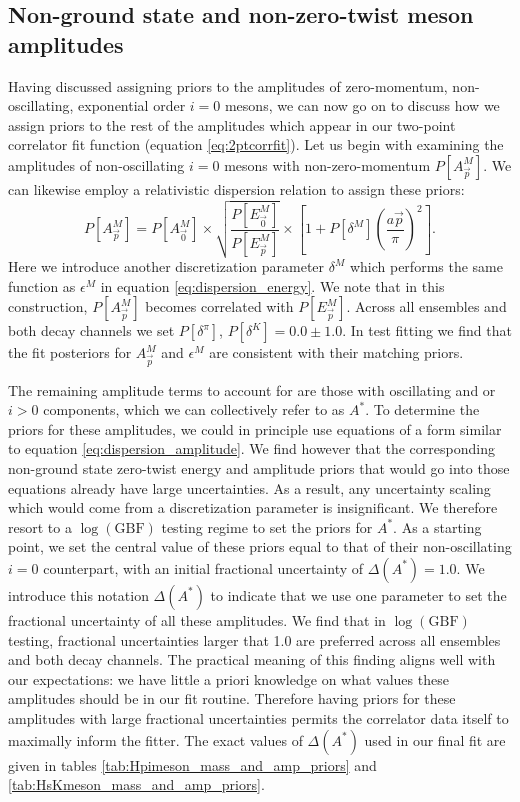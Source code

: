 \subsection{Non-ground state and non-zero-twist meson amplitudes}\label{sec:2ptamps_non_ground}
Having discussed assigning priors to the amplitudes of zero-momentum, non-oscillating, exponential order $i=0$ mesons, we can now go on to discuss how we assign priors to the rest of the amplitudes which appear in our two-point correlator fit function (equation \ref{eq:2ptcorrfit}).  Let us begin with examining the amplitudes of non-oscillating $i=0$ mesons with non-zero-momentum $P[A^{M}_{\vec{p}}]$.  We can likewise employ a relativistic dispersion relation to assign these priors:
\begin{equation}\label{eq:dispersion_amplitude}
P[A^{M}_{\vec{p}}] = P[A^{M}_{\vec{0}}] \times\sqrt{\frac{P[E^M_{\vec{0}}]}{P[E^M_{\vec{p}}]}} \times \left[ 1 + P[\delta^M] \left( \frac{a\vec{p}}{\pi} \right)^2     \right].
\end{equation}
Here we introduce another discretization parameter $\delta^M$ which performs the same function as $\epsilon^M$ in equation \ref{eq:dispersion_energy}.  We note that in this construction, $P[A^{M}_{\vec{p}}]$ becomes correlated with $P[E^M_{\vec{p}}]$. Across all ensembles and both decay channels we set $P[\delta^\pi]$, $P[\delta^K] = 0.0\pm1.0$.  In test fitting we find that the fit posteriors for $A^{M}_{\vec{p}}$ and $\epsilon^M$ are consistent with their matching priors.

The remaining amplitude terms to account for are those with oscillating and or $i>0$ components, which we can collectively refer to as $A^*$. To determine the priors for these amplitudes, we could in principle use equations of a form similar to equation \ref{eq:dispersion_amplitude}.  We find however that the corresponding non-ground state zero-twist energy and amplitude priors that would go into those equations already have large uncertainties.  As a result, any uncertainty scaling which would come from a discretization parameter is insignificant.  We therefore resort to a $\log(\mathrm{GBF})$ testing regime to set the priors for $A^*$.  As a starting point, we set the central value of these priors equal to that of their non-oscillating $i=0$ counterpart, with an initial fractional uncertainty of $\Delta(A^*)=1.0$.  We introduce this notation $\Delta(A^*)$ to indicate that we use one parameter to set the fractional uncertainty of all these amplitudes.  We find that in $\log(\mathrm{GBF})$ testing, fractional uncertainties larger that 1.0 are preferred across all ensembles and both decay channels.  The practical meaning of this finding aligns well with our expectations: we have little a priori knowledge on what values these amplitudes should be in our fit routine.  Therefore having priors for these amplitudes with large fractional uncertainties permits the correlator data itself to maximally inform the fitter.  The exact values of $\Delta(A^*)$ used in our final fit are given in tables \ref{tab:Hpimeson_mass_and_amp_priors} and \ref{tab:HsKmeson_mass_and_amp_priors}.

